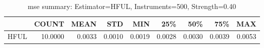 \begin{table}[ht]
\centering
\caption{mse summary: Estimator=HFUL, Instruments=500, Strength=0.40}
\begin{tabular}{lrrrrrrrr}
\toprule
 & COUNT & MEAN & STD & MIN & 25\% & 50\% & 75\% & MAX \\
\midrule
HFUL & 10.0000 & 0.0033 & 0.0010 & 0.0019 & 0.0028 & 0.0030 & 0.0039 & 0.0053 \\
\bottomrule
\end{tabular}
\end{table}
